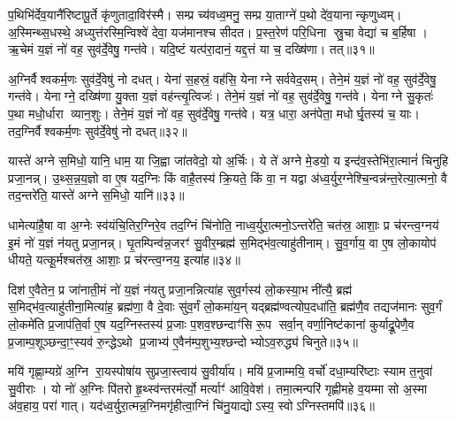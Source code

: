 प॒थिभि॑र्देव॒यानै॑रिष्टापू॒र्ते कृ॑णुतादा॒विर॑स्मै। सम्प्र च्य॑वध्व॒मनु॒ सम्प्र या॒ताग्ने॑ प॒थो दे॑व॒यानान्कृणुध्वम्। अ॒स्मिन्थ्स॒धस्थे॒ अध्युत्त॑रस्मि॒न्विश्वे॑ देवा॒ यज॑मानश्च सीदत। प्र॒स्त॒रेण॑ परि॒धिना स्रु॒चा वेद्या॑ च ब॒र्\mbox{}हिषा। ऋ॒चेमं य॒ज्ञं नो॑ वह॒ सुव॑र्दे॒वेषु॒ गन्त॑वे। यदि॒ष्टं यत्प॑रा॒दानं॒ यद्द॒त्तं या च॒ दख्षि॑णा। तत्॥३१॥

अ॒ग्निर्वैश्वकर्म॒णः सुव॑र्दे॒वेषु॑ नो दधत्। येना॑ स॒हस्रं॒ वह॑सि॒ येनाग्ने सर्ववेद॒सम्। तेने॒मं य॒ज्ञं नो॑ वह॒ सुव॑र्दे॒वेषु॒ गन्त॑वे। येनाग्ने॒ दख्षि॑णा यु॒क्ता य॒ज्ञं वह॑न्त्यृ॒त्विजः॑। तेने॒मं य॒ज्ञं नो॑ वह॒ सुव॑र्दे॒वेषु॒ गन्त॑वे। येनाग्ने सु॒कृतः॑ प॒था मधो॒र्धारा व्यान॒शुः। तेने॒मं य॒ज्ञं नो॑ वह॒ सुव॑र्दे॒वेषु॒ गन्त॑वे। यत्र॒ धारा॒ अन॑पेता॒ मधोर्घृ॒तस्य॑ च॒ याः। तद॒ग्निर्वैश्वकर्म॒णः सुव॑र्दे॒वेषु॑ नो दधत्॥३२॥

{\anuvakamend[{आ॒गच्छा॒त्तद्व्या॑न॒शुस्तेने॒मं य॒ज्ञन्नो॑ वह॒ सुव॑र्दे॒वेषु॒ गन्त॑वे॒ चतु॑र्दश च॥७॥}]}

यास्ते॑ अग्ने स॒मिधो॒ यानि॒ धाम॒ या जि॒ह्वा जा॑तवेदो॒ यो अ॒र्चिः। ये ते॑ अग्ने मे॒डयो॒ य इन्द॑व॒स्तेभि॑रा॒त्मानं॑ चिनुहि प्रजा॒नन्न्। उ॒थ्स॒न्न॒य॒ज्ञो वा ए॒ष यद॒ग्निः किं वाहै॒तस्य॑ क्रि॒यते॒ किं वा॒ न यद्वा अ॑ध्व॒र्युर॒ग्नेश्चि॒न्वन्न॑न्त॒रेत्या॒त्मनो॒ वै तद॒न्तरे॑ति॒ यास्ते॑ अग्ने स॒मिधो॒ यानि॑॥३३॥

धामेत्या॑है॒षा वा अ॒ग्नेः स्व॑यंचि॒तिर॒ग्निरे॒व तद॒ग्निं चि॑नोति॒ नाध्व॒र्युरा॒त्मनो॒ऽन्तरे॑ति॒ चत॑स्र॒ आशाः॒ प्र च॑रन्त्व॒ग्नय॑ इ॒मं नो॑ य॒ज्ञं न॑यतु प्रजा॒नन्न्। घृ॒तम्पिन्व॑न्न॒जरꣳ॑ सु॒वीर॒म्ब्रह्म॑ स॒मिद्भ॑व॒त्याहु॑तीनाम्। सु॒व॒र्गाय॒ वा ए॒ष लो॒कायोप॑ धीयते॒ यत्कू॒र्मश्चत॑स्र॒ आशाः॒ प्र च॑रन्त्व॒ग्नय॒ इत्या॑ह॥३४॥

दिश॑ ए॒वैतेन॒ प्र जा॑नाती॒मं नो॑ य॒ज्ञं न॑यतु प्रजा॒नन्नित्या॑ह सुव॒र्गस्य॑ लो॒कस्या॒भनी॑त्यै॒ ब्रह्म॑ स॒मिद्भ॑व॒त्याहु॑तीना॒मित्या॑ह॒ ब्रह्म॑णा॒ वै दे॒वाः सु॑व॒र्गं लो॒कमा॑य॒न् यद्ब्रह्म॑ण्वत्योप॒दधा॑ति॒ ब्रह्म॑णै॒व तद्यज॑मानः सुव॒र्गं लो॒कमे॑ति प्र॒जाप॑ति॒र्वा ए॒ष यद॒ग्निस्तस्य॑ प्र॒जाः प॒शव॒श्छन्दाꣳ॑सि रू॒प सर्वा॒न् वर्णा॒निष्ट॑कानां कुर्याद्रू॒पेणै॒व प्र॒जाम्प॒शूञ्छन्दा॒ꣳ॒स्यव॑ रु॒न्द्धेऽथो प्र॒जाभ्य॑ ए॒वैन॑म्प॒शुभ्य॒श्छन्दोभ्योऽव॒रुद्ध्य॑ चिनुते॥३५॥

{\anuvakamend[{यान्य॒ग्नय॒ इत्या॒हेष्ट॑काना॒ꣳ॒ षोड॑श च॥८॥}]}

मयि॑ गृह्णा॒म्यग्रे॑ अ॒ग्नि रा॒यस्पोषा॑य सुप्रजा॒स्त्वाय॑ सु॒वीर्या॑य। मयि॑ प्र॒जाम्मयि॒ वर्चो॑ दधा॒म्यरि॑ष्टाः स्याम त॒नुवा॑ सु॒वीराः। यो नो॑ अ॒ग्निः पि॑तरो हृ॒थ्स्व॑न्तरम॑र्त्यो॒ मर्त्याꣳ॑ आवि॒वेश॑। तमा॒त्मन्परि॑ गृह्णीमहे व॒यम्मा सो अ॒स्मा अ॑व॒हाय॒ परा॑ गात्। यद॑ध्व॒र्युरा॒त्मन्न॒ग्निमगृ॑हीत्वा॒ग्निं चि॑नु॒याद्योऽस्य॒ स्वोऽग्निस्तमपि॑॥३६॥

